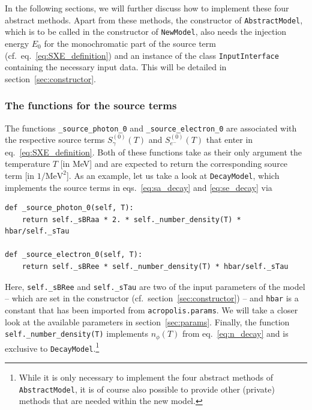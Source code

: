 \documentclass[11pt,a4paper]{article}
\begin{document}
\vspace{4mm}
In the following sections, we will further discuss how to implement these four abstract methods. Apart from these methods, the constructor of \texttt{AbstractModel}, which is to be called in the constructor of \texttt{NewModel}, also needs the injection energy $E_0$ for the monochromatic part of the source term (cf.\ eq.~\eqref{eq:SXE_definition}) and an instance of the class \texttt{InputInterface} containing the necessary input data. This will be detailed in section~\ref{sec:constructor}.

\subsubsection{The functions for the source terms}
The functions \texttt{\_source\_photon\_0} and \texttt{\_source\_electron\_0} are associated with the respective source terms $S_\gamma^{(0)}(T)$ and $S_{e^-}^{(0)}(T)$ that enter in eq.~\eqref{eq:SXE_definition}. Both of these functions take as their only argument the temperature $T$ [in MeV] and are expected to return the corresponding source term [in $1/\mathrm{MeV}^2$]. As an example, let us take a look at \texttt{DecayModel}, which implements the source terms in eqs.~\eqref{eq:sa_decay} and \eqref{eq:se_decay} via
\begin{lstlisting}
def _source_photon_0(self, T):
	return self._sBRaa * 2. * self._number_density(T) * hbar/self._sTau

def _source_electron_0(self, T):
	return self._sBRee * self._number_density(T) * hbar/self._sTau
\end{lstlisting}
Here, \texttt{self.\_sBRee} and \texttt{self.\_sTau} are two of the input parameters of the model -- which are set in the constructor (cf.\ section~\ref{sec:constructor}) -- and \texttt{hbar} is a constant that has been imported from \texttt{acropolis.params}. We will take a closer look at the available parameters in section~\ref{sec:params}. Finally, the function \texttt{self.\_number\_density(T)} implements $n_\phi(T)$ from eq.~\eqref{eq:n_decay} and is exclusive to \texttt{DecayModel}.\footnote{While it is only necessary to implement the four abstract methods of \texttt{AbstractModel}, it is of course also possible to provide other (private) methods that are needed within the new model.}
\end{document}

